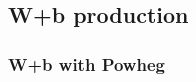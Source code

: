 \documentclass[11pt]{cernrep} \usepackage{graphicx,epsfig} 
\begin{document}



\subsection{W+b production \label{Wbb}}

\subsubsection{W+b with Powheg}
\end{document}
